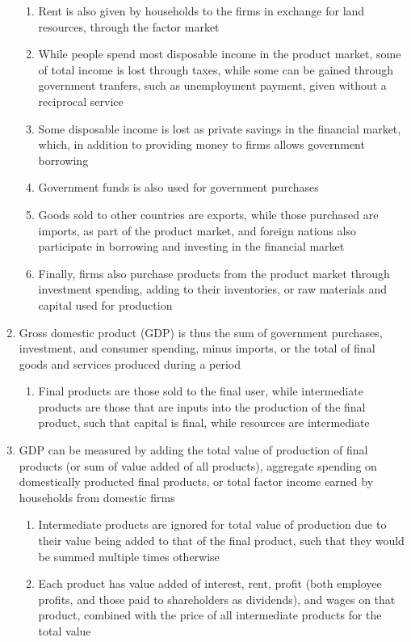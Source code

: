 \documentclass[11 pt, twoside]{article}
\begin{document}
\begin{enumerate}
\begin{enumerate}
\item Rent is also given by households to the firms in exchange for land resources, through the factor market
\item While people spend most disposable income in the product market, some of total income is lost through taxes, while some can be gained through government tranfers, such as unemployment payment, given without a reciprocal service
\item Some disposable income is lost as private savings in the financial market, which, in addition to providing money to firms allows government borrowing
\item Government funds is also used for government purchases
\item Goods sold to other countries are exports, while those purchased are imports, as part of the product market, and foreign nations also participate in borrowing and investing in the financial market
\item Finally, firms also purchase products from the product market through investment spending, adding to their inventories, or raw materials and capital used for production
\end{enumerate}
\item Gross domestic product (GDP) is thus the sum of government purchases, investment, and consumer spending, minus imports, or the total of final goods and services produced during a period
\begin{enumerate}
\item Final products are those sold to the final user, while intermediate products are those that are inputs into the production of the final product, such that capital is final, while resources are intermediate
\end{enumerate}
\item GDP can be measured by adding the total value of production of final products (or sum of value added of all products), aggregate spending on domestically producted final products, or total factor income earned by households from domestic firms
\begin{enumerate}
\item Intermediate products are ignored for total value of production due to their value being added to that of the final product, such that they would be summed multiple times otherwise
\item Each product has value added of interest, rent, profit (both employee profits, and those paid to shareholders as dividends), and wages on that product, combined with the price of all intermediate products for the total value

\end{enumerate}
\end{enumerate}
\end{document}
